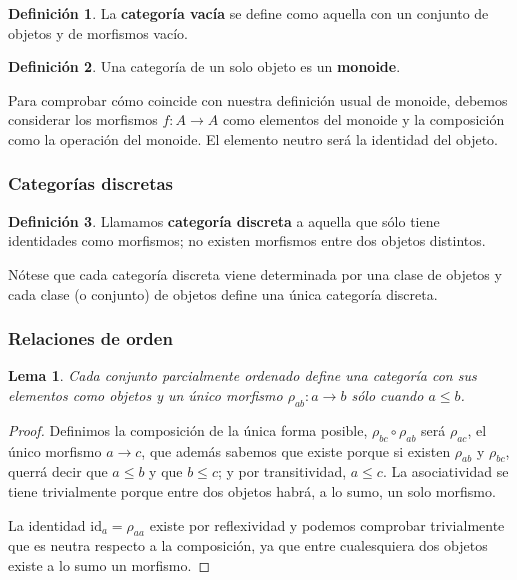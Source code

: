 \documentclass[11pt]{article}
\theoremstyle{plain}
\newtheorem{lemma}{Lema}
\theoremstyle{definition}
\newtheorem{definition}{Definición}
\theoremstyle{remark}
\begin{document}
\begin{definition}
La \textbf{categoría vacía} se define como aquella con un conjunto de objetos
y de morfismos vacío.
\end{definition}

\begin{definition}
Una categoría de un solo objeto es un \textbf{monoide}.
\end{definition}

Para comprobar cómo coincide con nuestra definición usual de monoide,
debemos considerar los morfismos \(f \colon A \to A\) como elementos del monoide
y la composición como la operación del monoide. El elemento neutro será
la identidad del objeto.

\subsubsection{Categorías discretas}
\label{sec:orgb4d16c9}
\begin{definition}
Llamamos \textbf{categoría discreta} a aquella que sólo tiene identidades como
morfismos; no existen morfismos entre dos objetos distintos.
\end{definition}

Nótese que cada categoría discreta viene determinada por una clase de
objetos y cada clase (o conjunto) de objetos define una única categoría
discreta.

\subsubsection{Relaciones de orden}
\label{sec:org9fd3406}
\begin{lemma}
Cada conjunto parcialmente ordenado define una categoría con sus elementos
como objetos y un único morfismo \(\rho_{ab} \colon a \to b\) sólo cuando \(a \leq b\).
\end{lemma}

\begin{proof}
Definimos la composición de la única forma posible, \(\rho_{bc}\circ\rho_{ab}\) será \(\rho_{ac}\), el
único morfismo \(a \to c\), que además sabemos que existe porque si existen
\(\rho_{ab}\) y \(\rho_{bc}\), querrá decir que \(a \leq b\) y que \(b \leq c\); y por transitividad, \(a \leq c\).
La asociatividad se tiene trivialmente porque entre dos objetos habrá,
a lo sumo, un solo morfismo.

La identidad \(\mathrm{id}_a = \rho_{aa}\) existe por reflexividad y podemos comprobar 
trivialmente que es neutra respecto a la composición, ya que entre 
cualesquiera dos objetos existe a lo sumo un morfismo.
\end{proof}
\end{document}
